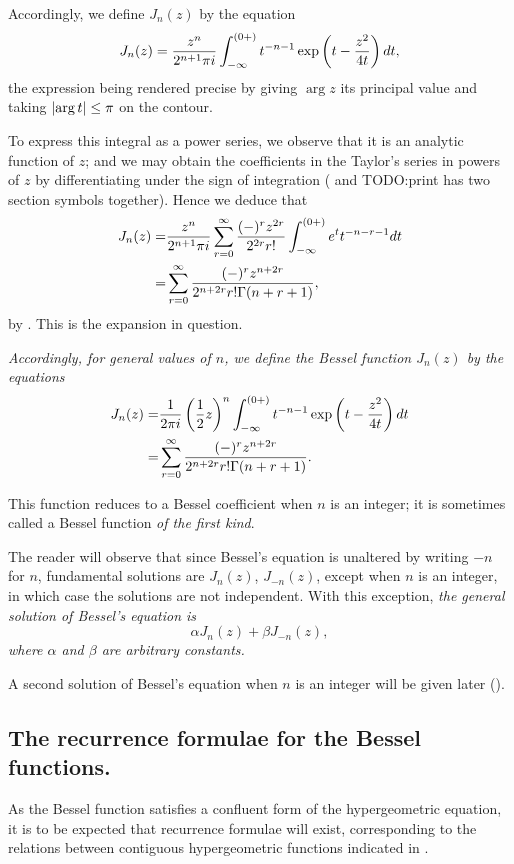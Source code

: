 \documentclass{book}
\begin{document}
Accordingly, we define $J_n(z)$ by the equation
$$
J_n(z) 
= 
\frac{z^n}{2^{n+1}\pi i}
\int_{-\infty}^{(0+)}
t^{-n-1} 
\exp\left(  t - \frac{z^2}{4t}   \right)
d t,
$$
the expression being rendered precise by giving
$\arg z$ its principal value and taking
$\left|  \arg t  \right| \leq \pi$ on the contour.

To express this integral as a power series, we observe that it is an
analytic function of $z$; and we may obtain the coefficients in the
Taylor's series in powers of $z$ by differentiating under the sign of 
integration
( and 
TODO:print has two section symbols together).
Hence we deduce that
\begin{align*}
  J_n(z)
  =& \frac{z^n}{2^{n+1}\pi i}
  \sum_{r=0}^{\infty} \frac{ (-)^r z^{2r}  }{ 2^{2r} r!  }
  \int_{-\infty}^{(0+)}
  e^t
  t^{-n-r-1}
  d t
  \\
  =&
  \sum_{r=0}^{\infty}
  \frac{ (-)^r z^{n+2r}  }{ 2^{n+2r} r! \Gamma(n+r+1)  },
\end{align*}
by . This is the expansion in question.

%
%
\emph{Accordingly, for general values of $n$, we define the
  \emph{Bessel function} $J_n(z)$ by the equations}
\begin{align*}
  J_n(z)
  =& \frac{1}{2\pi i} \left( \frac{1}{2} z \right)^n
  \int_{-\infty}^{(0+)}
  t^{-n-1}
  \exp\left(  t - \frac{z^2}{4t}   \right)
  d t
  \\
  =&
  \sum_{r=0}^{\infty}
  \frac{ (-)^r z^{n+2r}  }{ 2^{n+2r} r! \Gamma(n+r+1)  }.
\end{align*}

This function reduces to a Bessel coefficient when $n$ is an integer;
it is sometimes called a Bessel function \emph{of the first kind}.

The reader will observe that since Bessel's equation is unaltered by
writing $-n$ for $n$, fundamental solutions are $J_n(z)$, $J_{-n}(z)$,
except when $n$ is an integer, in which case the solutions are not
independent. With this exception, \emph{the general solution of
  Bessel's equation is
$$
\alpha J_n(z) + \beta J_{-n}(z),
$$
where $\alpha$ and $\beta$ are arbitrary constants.}

A second solution of Bessel's equation when $n$ is an integer will be
given later ().

\subsection{The recurrence formulae for the Bessel functions.}
As the Bessel function satisfies a confluent form of the
hypergeometric equation, it is to be expected that recurrence formulae
will exist, corresponding to the relations between contiguous
hypergeometric functions indicated in .
\end{document}
